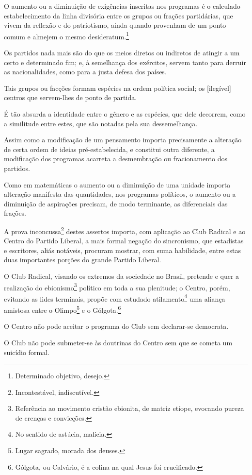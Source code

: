 O aumento ou a diminuição de exigências inscritas nos programas é o
calculado estabelecimento da linha divisória entre os grupos ou frações
partidárias, que vivem da reflexão e do patriotismo, ainda quando
provenham de um ponto comum e almejem o mesmo desideratum.\footnote{
  Determinado objetivo, desejo.}

Os partidos nada mais são do que os meios diretos ou indiretos de
atingir a um certo e determinado fim; e, à semelhança dos exércitos,
servem tanto para derruir as nacionalidades, como para a justa defesa
dos países.

Tais grupos ou facções formam espécies na ordem política social; os
{[}ilegível{]} centros que servem-lhes de ponto de partida.

É tão absurda a identidade entre o gênero e as espécies, que dele
decorrem, como a similitude entre estes, que são notadas pela sua
dessemelhança.

Assim como a modificação de um pensamento importa precisamente a
alteração de certa ordem de ideias pré-estabelecida, e constitui outra
diferente, a modificação dos programas acarreta a desmembração ou
fracionamento dos partidos.

Como em matemáticas o aumento ou a diminuição de uma unidade importa
alteração manifesta das quantidades, nos programas políticos, o aumento
ou a diminuição de aspirações precisam, de modo terminante, as
diferenciais das frações.

A prova inconcussa\footnote{Incontestável, indiscutível.} destes
assertos importa, com aplicação ao Club Radical e ao Centro do Partido
Liberal, a mais formal negação do sincronismo, que estadistas e
escritores, aliás notáveis, procuram mostrar, com suma habilidade, entre
estas duas importantes porções do grande Partido Liberal.

O Club Radical, visando os extremos da sociedade no Brasil, pretende e
quer a realização do ebionismo\footnote{Referência ao movimento
  cristão ebionita, de matriz etíope, evocando pureza de crenças e
  convicções.} político em toda a sua plenitude; o Centro, porém,
evitando as lides terminais, propõe com estudado atilamento\footnote{
  No sentido de astúcia, malícia.} uma aliança amistosa entre o
Olimpo\footnote{Lugar sagrado, morada dos deuses.} e o
Gólgota.\footnote{Gólgota, ou Calvário, é a colina na qual Jesus foi
  crucificado.}

O Centro não pode aceitar o programa do Club sem declarar-se democrata.

O Club não pode submeter-se às doutrinas do Centro sem que se cometa um
suicídio formal.

